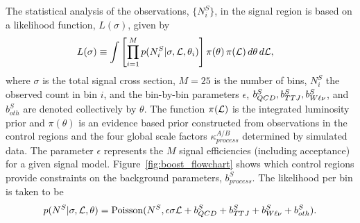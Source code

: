 



The statistical analysis of the observations,  $\{ N^S_i \}$, in the signal region is based on a
likelihood function, $L(\sigma)$, given by
\begin{align}
  L(\sigma) & \equiv  \int   \left[ \prod_{i=1}^M p(N^S_i | \sigma, {\cal L}, \theta_i)  \right] 
\pi(\theta) \, \pi({\cal L}) \, d\theta \, d{\cal L},
\label{eq:marginal}
\end{align}
where $\sigma$ is the total signal cross section, $M = 25$ is the number of bins, $N^S_i$ the
observed count in bin $i$, and the bin-by-bin parameters  $\epsilon$,  $b^S_{QCD}, b^S_{TTJ},
b^S_{W\ell\nu}$, and $b^S_{oth}$ are  denoted collectively by $\theta$. 
The function $\pi({\cal L})$ is the integrated luminosity prior and $\pi(\theta)$ is an evidence
based prior constructed from observations in the control regions and the four global scale factors
$\kappa^{A/B}_{process}$ determined by simulated data. 
The parameter $\epsilon$ represents the $M$ signal efficiencies (including acceptance) for a given
signal model. Figure~\ref{fig:boost_flowchart} shows which control regions provide constraints on
the background parameters, $b^S_{process}$.
The likelihood per bin is taken to be
\begin{equation}
 p(N^S | \sigma, {\cal L}, \theta) = \textrm{Poisson}(N^S,  \epsilon \sigma {\cal L} + b^S_{QCD} +
b^S_{TTJ} + b^S_{W\ell\nu} +  b^{S}_{oth}) .
\end{equation}

